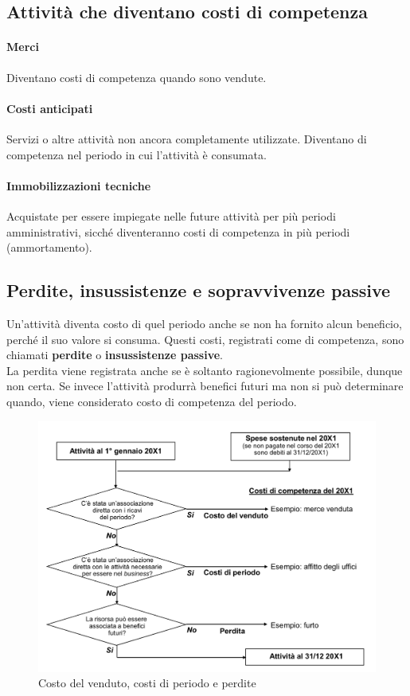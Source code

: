 \documentclass{report}
\begin{document}
	\subsection{Attività che diventano costi di competenza}
	\paragraph{Merci} Diventano costi di competenza quando sono vendute.
	\paragraph{Costi anticipati} Servizi o altre attività non ancora completamente utilizzate. Diventano di competenza nel periodo in cui l'attività è consumata.
	\paragraph{Immobilizzazioni tecniche} Acquistate per essere impiegate nelle future attività per più periodi amministrativi, sicché diventeranno costi di competenza in più periodi (ammortamento).
	\subsection{Perdite, insussistenze e sopravvivenze passive}
	Un'attività diventa costo di quel periodo anche se non ha fornito alcun beneficio, perché il suo valore si consuma. Questi costi, registrati come di competenza, sono chiamati \textbf{perdite} o \textbf{insussistenze passive}.
	\medskip \\La perdita viene registrata anche se è soltanto ragionevolmente possibile, dunque non certa. Se invece l'attività produrrà benefici futuri ma non si può determinare quando, viene considerato costo di competenza del periodo.
	\begin{figure}[h]
		\centering
		\includegraphics[width=0.7\linewidth]{images/sintesi-costi-perdite}
		\caption{Costo del venduto, costi di periodo e perdite}
		\label{fig:sintesi-costi-perdite}
	\end{figure}
	\newpage
\end{document}
